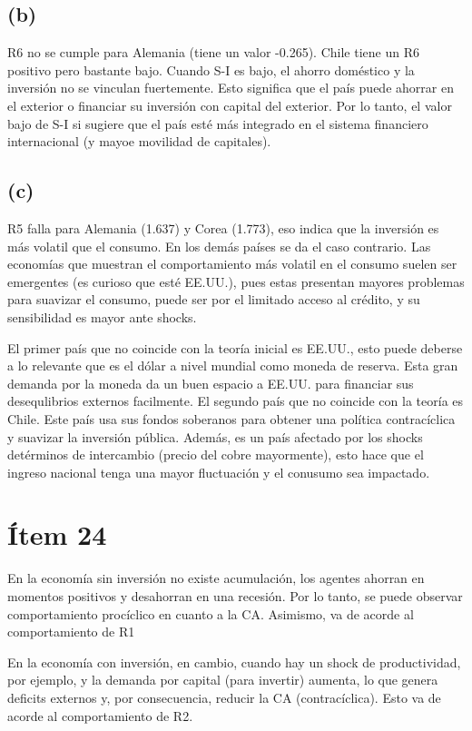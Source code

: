 \subsection*{(b)}
R6 no se cumple para Alemania (tiene un valor -0.265). Chile tiene un R6 positivo pero bastante bajo.
Cuando S-I es bajo, el ahorro doméstico y la inversión no se vinculan fuertemente. Esto significa que el país puede ahorrar en el exterior o financiar su inversión con capital del exterior. Por lo tanto, el valor bajo de S-I si sugiere que el país esté más integrado en el sistema financiero internacional (y mayoe movilidad de capitales).


\subsection*{(c)}
R5 falla para Alemania (1.637) y Corea (1.773), eso indica que la inversión es más volatil que el consumo. En los demás países se da el caso contrario. Las economías que muestran el comportamiento más volatil en el consumo suelen ser emergentes (es curioso que esté EE.UU.), pues estas presentan mayores problemas para suavizar el consumo, puede ser por el limitado acceso al crédito, y su sensibilidad es mayor ante shocks.


El primer país que no coincide con la teoría inicial es EE.UU., esto puede deberse a lo relevante que es el dólar a nivel mundial como moneda de reserva. Esta gran demanda por la moneda da un buen espacio a EE.UU. para financiar sus desequlibrios externos facilmente.
El segundo país que no coincide con la teoría es Chile. Este país usa sus fondos soberanos para obtener una política contracíclica y suavizar la inversión pública. Además, es un país afectado por los shocks detérminos de intercambio (precio del cobre mayormente), esto hace que el ingreso nacional tenga una mayor fluctuación y el conusumo sea impactado.


\section*{Ítem 24}

En la economía sin inversión no existe acumulación, los agentes ahorran en momentos positivos y desahorran en una recesión. Por lo tanto, se puede observar comportamiento procíclico en cuanto a la CA. Asimismo, va de acorde al comportamiento de R1

En la economía con inversión, en cambio, cuando hay un shock de productividad, por ejemplo, y la demanda por capital (para invertir) aumenta, lo que genera deficits externos y, por consecuencia, reducir la CA (contracíclica). Esto va de acorde al comportamiento de R2.

